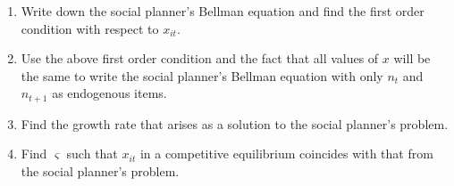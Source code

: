 \documentclass[11pt]{article}
\begin{document}
\begin{enumerate}
\begin{enumerate}
\item Write down the social planner's Bellman equation and find the first
order condition with respect to $x_{it}.$

\item Use the above first order condition and the fact that all values of $x$
will be the same to write the social planner's Bellman equation with only $%
n_{t}$ and $n_{t+1}$ as endogenous items.

\item Find the growth rate that arises as a solution to the social planner's
problem.

\item Find $\varsigma $ such that $x_{it}$ in a competitive equilibrium
coincides with that from the social planner's problem.
\end{enumerate}

\pagebreak \bigskip
\end{enumerate}

\bigskip
\end{document}
